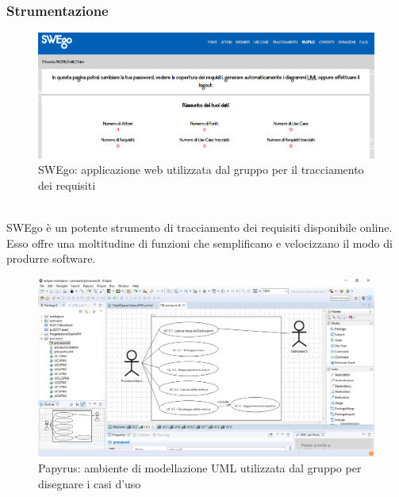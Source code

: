 \newpage

	\subsubsection{Strumentazione} \label{sviluppo_strumentazione}


			\begin{figure}[htbp]
				\centering
				\includegraphics[scale=0.3]{./img/swego.png}
				\caption[SWEgo]{SWEgo: applicazione web utilizzata dal gruppo per il tracciamento dei requisiti}
			\end{figure}\\

			SWEgo è un potente strumento di tracciamento dei requisiti disponibile online. Esso offre una moltitudine
			di funzioni che semplificano e velocizzano il modo di produrre software.

\newpage


			\begin{figure}[htbp]
				\centering
				\includegraphics[scale=0.4]{./img/papyrus.png}
				\caption[Papyrus]{Papyrus: ambiente di modellazione UML utilizzata dal gruppo per disegnare i casi d'uso}
			\end{figure}\\

